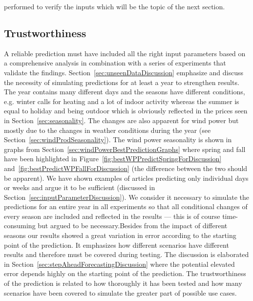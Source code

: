 performed to verify the inputs which will be the topic of the next section.  

\subsection{Trustworthiness}
A reliable prediction must have included all the right input parameters based on a comprehensive analysis in combination with a series of experiments that validate the findings. Section~\ref{sec:unseenDataDiscussion} emphasize and discuss the necessity of simulating predictions for at least a year to strengthen results. The year contains many different days and the seasons have different conditions, e.g. winter calls for heating and a lot of indoor activity whereas the summer is equal to holiday and being outdoor which is obviously reflected in the prices seen in Section~\ref{sec:seasonality}. The changes are also apparent for wind power but mostly due to the changes in weather conditions during the year (see Section~\ref{sec:windProdSeasonality}). The wind power seasonality is shown in graphs from Section~\ref{sec:windPowerBestPredictionGraphs} where spring and fall have been highlighted in Figure~\ref{fig:bestWPPredictSpringForDiscussion} and~\ref{fig:bestPredictWPFallForDiscussion} (the difference between the two should be apparent). We have shown examples of articles predicting only individual days or weeks and argue it to be sufficient (discussed in Section~\ref{sec:inputParameterDiscussion}). We consider it necessary to simulate the predictions for an entire year in all experiments so that all conditional changes of every season are included and reflected in the results --- this is of course time-consuming but argued to be necessary.Besides from the impact of different seasons our results showed a great variation in error according to the starting point of the prediction. It emphasizes how different scenarios have different results and therefore must be covered during testing. The discussion is elaborated in Section~\ref{sec:stepAheadForecastingDiscussion} where the potential elevated error depends highly on the starting point of the prediction. The trustworthiness of the prediction is related to how thoroughly it has been tested and how many scenarios have been covered to simulate the greater part of possible use cases. 

